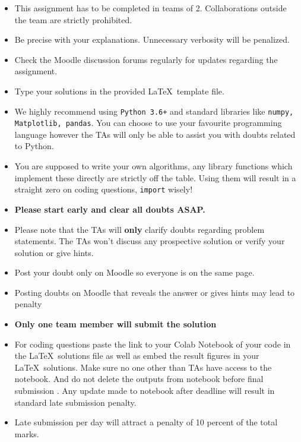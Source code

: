 \documentclass[addpoints,12pt,solution]{exam}
\begin{document}
{\small

\begin{itemize}\itemsep0mm

\item This assignment has to be completed in teams of 2. Collaborations outside the team are strictly prohibited.

\item Be precise with your explanations. Unnecessary verbosity will be penalized.

\item Check the Moodle discussion forums regularly for updates regarding the assignment.

\item Type your solutions in the provided \LaTeX ~template file.


\item We highly recommend using \texttt{Python 3.6+} and standard libraries like \texttt{numpy, Matplotlib, pandas}. You can choose to use your favourite programming language however the TAs will only be able to assist you with doubts related to Python. 

\item You are supposed to write your own algorithms, any library functions which implement these directly are strictly off the table. Using them will result in a straight zero on coding questions, \texttt{import} wisely!

\item \textbf{Please start early and clear all doubts ASAP.}

\item Please note that the TAs will \textbf{only} clarify doubts regarding problem statements. The TAs won't discuss any prospective solution or verify your solution or give hints.  

\item Post your doubt only on Moodle so everyone is on the same page.

\item Posting doubts on Moodle that reveals the answer or gives hints may lead to penalty

\item \textbf{Only one team member will submit the solution} 

\item For coding questions paste the link to your Colab Notebook of your code in the \LaTeX ~solutions file as well as embed the result figures in your \LaTeX ~solutions. Make sure no one other than TAs have access to the notebook. And do not delete the outputs from notebook before final submission . Any update made to notebook after deadline will result in standard late submission penalty.
\item Late submission per day will attract a penalty of 10 percent of the total marks.

\end{itemize}
}
\end{document}
